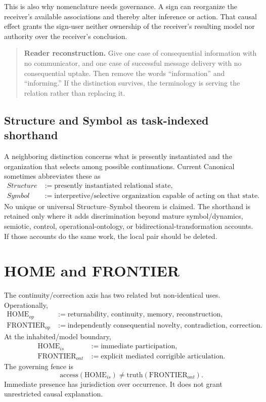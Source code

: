 \documentclass[11pt]{article}
\newenvironment{readercheck}{\begin{quote}\small\noindent\textbf{Reader reconstruction.}\;}{\end{quote}}
\begin{document}
This is also why nomenclature needs governance. A sign can reorganize the receiver's available associations and thereby alter inference or action. That causal effect grants the sign-user neither ownership of the receiver's resulting model nor authority over the receiver's conclusion.

\begin{readercheck}
Give one case of consequential information with no communicator, and one case of successful message delivery with no consequential uptake. Then remove the words ``information'' and ``informing.'' If the distinction survives, the terminology is serving the relation rather than replacing it.
\end{readercheck}

\subsection{Structure and Symbol as task-indexed shorthand}

A neighboring distinction concerns what is presently instantiated and the organization that selects among possible continuations. Current Canonical sometimes abbreviates these as
\begin{align}
Structure &:= \text{presently instantiated relational state},\\
Symbol &:= \text{interpretive/selective organization capable of acting on that state}.
\end{align}
No unique or universal Structure--Symbol theorem is claimed. The shorthand is retained only where it adds discrimination beyond mature symbol/dynamics, semiotic, control, operational-ontology, or bidirectional-transformation accounts. If those accounts do the same work, the local pair should be deleted.

\section{HOME and FRONTIER}

The continuity/correction axis has two related but non-identical uses. Operationally,
\begin{align}
\mathrm{HOME}_{op} &:= \text{returnability, continuity, memory, reconstruction},\\
\mathrm{FRONTIER}_{op} &:= \text{independently consequential novelty, contradiction, correction}.
\end{align}
At the inhabited/model boundary,
\begin{align}
\mathrm{HOME}_{is} &:= \text{immediate participation},\\
\mathrm{FRONTIER}_{ont} &:= \text{explicit mediated corrigible articulation}.
\end{align}
The governing fence is
\begin{equation}
\mathrm{access}(\mathrm{HOME}_{is})\neq\mathrm{truth}(\mathrm{FRONTIER}_{ont}).
\end{equation}
Immediate presence has jurisdiction over occurrence. It does not grant unrestricted causal explanation.
\end{document}

